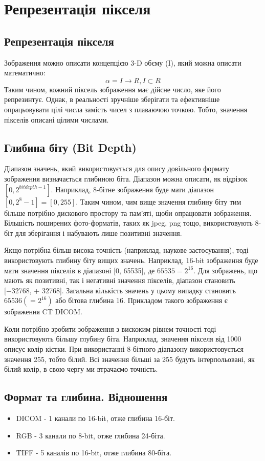 \chapter{Репрезентація пікселя}\label{cha:ch_1}

\section{Репрезентація пікселя}\label{sec:pixel_definition}
Зображення можно описати концепцією 3-D обєму (I), який можна описати математично:
\[ \alpha = I \rightarrow R, I \subset R \]\cite{img_operators:4}
Таким чином, кожний піксель зображення має дійсне число, яке його репрезинтує.
Однак, в реальності зручніше зберігати та ефективніше опрацьовувати цілі числа замість чисел з плаваючою точкою.
Тобто, значення пікселів описані цілими числами.

\section{Глибина біту (Bit Depth)}\label{sec:bit_depth}
Діапазон значень, який використовується для опису довільного формату зображення визначається глибиною біта.
Діапазон можна описати, як відрізок \([0, 2^{bitdepth - 1}]\).\cite{img_operators:4}
Наприклад, 8-бітне зображення буде мати діапазон \([0, 2^{8} - 1] = [0, 255]\).\cite{img_operators:4}
Таким чином, чим вище значення глибину біту тим більше потрібно дискового простору та пам'яті, щоби опрацювати зображення.
Більшість поширених фото-форматів, таких як jpeg, png тощо, використовують 8-біт для зберігання і набувають лише позитивні значення.

Якщо потрібна більш висока точність (наприклад, наукове застосування), тоді використовують глибину біту вищих значень.
Наприклад, 16-bit зображення буде мати значення пікселів в діапазоні [0, 65535], де  \(65535 = 2^{16}\).\cite{img_operators:4}
Для зображень, що мають як позитивні, так і негативні значення пікселів, діапазон становить [−32768, + 32768].\cite{img_operators:4}
Загальна кількість значень у цьому випадку становить \(65536(=2^{16})\) або бітова глибина 16.\cite{img_operators:4}
Прикладом такого зображення є зображення CT DICOM.

Коли потрібно зробити зображення з вискоким рівнем точності тоді використовують більшу глубину біта.
Наприклад, значення пікселя від 1000 описує колір кістки.
При використанні 8-бітного діапазону використовується значення 255, тобто білий.
Всі значення більші за 255 будуть інтерпольовані, як білий колір, в свою чергу ми втрачаємо точність.

\section{Формат та глибина. Відношення}\label{sec:formats}
\begin{itemize}
    \item DICOM - 1 канали по 16-bit, отже глибина 16-біт.
    \item RGB - 3 канали по 8-bit, отже глибина 24-біта.
    \item TIFF - 5 каналів по 16-bit, отже глибина 80-біта.
\end{itemize}
